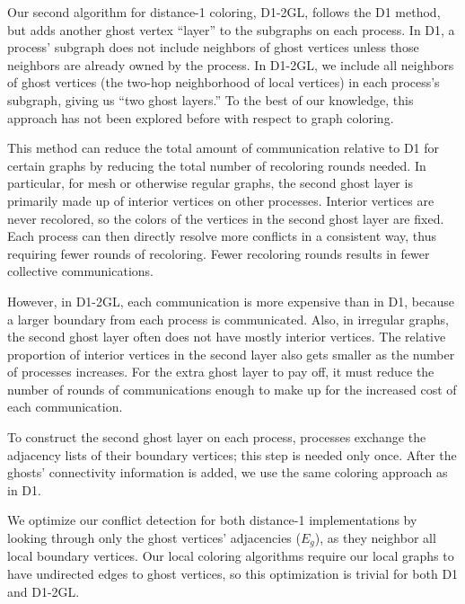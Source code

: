 Our second algorithm for distance-1 coloring, D1-2GL, follows the D1 method, but adds another ghost vertex ``layer'' to the subgraphs on each process.
In D1, a process' subgraph does not include neighbors of ghost vertices unless those neighbors are already owned by the process.
In D1-2GL, we include all neighbors of ghost vertices (the two-hop neighborhood of local vertices) in each process's subgraph, giving us ``two ghost layers.''
To the best of our knowledge, this approach has not been explored before with respect to graph coloring.

This method can reduce the total amount of communication relative to D1 for certain graphs by reducing the total number of recoloring rounds needed.
In particular, for mesh or otherwise regular graphs, the second ghost layer is primarily made up of interior vertices on other processes.
Interior vertices are never recolored, so the colors of the vertices in the second ghost layer are fixed. Each process can then directly resolve more conflicts in a consistent way, thus requiring fewer rounds of recoloring.
Fewer recoloring rounds results in fewer collective communications.

However, in D1-2GL, each communication is more expensive than in D1, because a larger boundary from each process is communicated.
Also, in irregular graphs, the second ghost layer often does not have mostly interior vertices.
The relative proportion of interior vertices in the second layer also gets smaller as the number of processes increases.
For the extra ghost layer to pay off, it must reduce the number of rounds of communications enough to make up for the increased cost of each communication. 

To construct the second ghost layer on each process, processes exchange the adjacency lists of their boundary vertices; this step is needed only once.
After the ghosts' connectivity information is added, we use the same coloring approach as in D1.

We optimize our conflict detection for both distance-1 implementations by looking through only the ghost vertices' adjacencies ($E_g$), as they neighbor all local boundary vertices.
Our local coloring algorithms require our local graphs to have undirected edges to ghost vertices, so this optimization is trivial for both D1 and D1-2GL.

